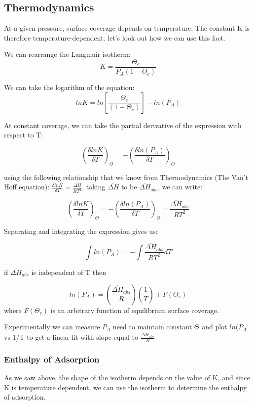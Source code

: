 \documentclass[ignorenonframetext]{beamer}
\begin{document}
\subsection{Thermodynamics}

At a given pressure, surface coverage depends on temperature. The constant K is therefore temperature-dependent. let's look out how we can use this fact.

We can rearrange the Langmuir isotherm: 
\[K = \frac{\Theta_e}{P_A(1-\Theta_e)}\]

We can take the logarithm of the equation:
\[lnK = ln\left[\frac{\Theta_e}{(1-\Theta_e)}\right] - ln(P_A)\]

At constant coverage, we can take the partial derivative of the expression with respect to T:

\[\left(\frac{\delta lnK}{\delta T}\right)_\Theta = -\left(\frac{\delta ln(P_A)}{\delta T}\right)_\Theta\]

using the following relationship that we know from Thermodynamics (The Van't Hoff equation): \(\frac{\delta ln K}{\delta T} = \frac{\overline{\Delta H}}{RT^2}\), taking \(\overline{\Delta H}\) to be \(\overline{\Delta H}_{abs}\), we can write:

\[\left(\frac{\delta lnK}{\delta T}\right)_\Theta = - \left(\frac{\delta ln(P_A)}{\delta T}\right)_\Theta = \frac{\overline{\Delta H}_{abs}}{RT^2}\]

Separating and integrating the expression gives us:

\[\int ln(P_A) = - \int \frac{\overline{\Delta H}_{abs}}{RT^2} dT\]

if \(\overline{\Delta H}_{abs}\) is independent of T then

\[ln(P_A) = \left(\frac{\overline{\Delta H}_{abs}}{R}\right)\left(\frac{1}{T}\right) + F(\Theta_e)\] where \(F(\Theta_e)\) is an arbitrary function of equilibrium surface coverage.

Experimentally we can measure \(P_A\) need to maintain constant \(\Theta\) and plot \(ln(P_A\) vs 1/T to get a linear fit with slope equal to \(\frac{\overline{\Delta H}_{abs}}{R}\)

\subsubsection{Enthalpy of Adsorption}
As we saw above, the shape of the isotherm depends on the value of K, and since K is temperature dependent, we can use the isotherm to determine the enthalpy of adsorption.
\end{document}
